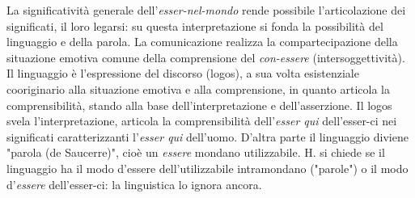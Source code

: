 \documentclass[a4paper,12pt,oneside]{article}%
\begin{document}
La significatività generale dell'\textit{esser-nel-mondo} rende possibile l'articolazione dei significati, il loro legarsi: su questa interpretazione si fonda la possibilità del linguaggio e della parola. La comunicazione realizza la compartecipazione della situazione emotiva comune della comprensione del \textit{con-essere} (intersoggettività). Il linguaggio  è l'espressione del discorso (logos), a sua volta esistenziale cooriginario alla situazione emotiva e alla comprensione, in quanto articola la comprensibilità, stando alla base dell'interpretazione e dell'asserzione. Il logos svela l'interpretazione, articola la comprensibilità dell'\textit{esser qui} dell'esser-ci nei significati caratterizzanti l'\textit{esser qui} dell'uomo. D'altra parte il linguaggio diviene "parola (de Saucerre)", cioè un \textit{essere} mondano utilizzabile. H. si chiede se il linguaggio ha il modo d'essere dell'utilizzabile intramondano ("parole") o il modo d'\textit{essere} dell'esser-ci: la linguistica lo ignora ancora.
\end{document}

